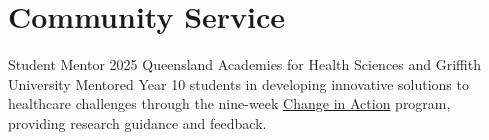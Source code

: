 \documentclass[../main.tex]{subfiles}
\begin{document}
\section{Community Service}
  \vspace{2pt}
  \resumeSubHeadingListStart


  \layoutCommunity
    {Student Mentor}
    {2025}
    {Queensland Academies for Health Sciences and Griffith University}
    {Mentored Year 10 students in developing innovative solutions to healthcare challenges through the nine-week \href{https://gchkp.com.au/events/2025-qahs-change-in-action-showcase/}{Change in Action} program, providing research guidance and feedback.}

  \resumeSubHeadingListEnd
\end{document}

